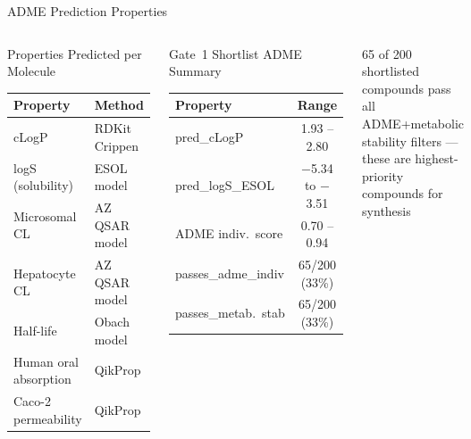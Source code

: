 \documentclass[aspectratio=169]{beamer}
\begin{document}
\begin{frame}{ADME Prediction Properties}
  \begin{columns}
    \begin{block}{Properties Predicted per Molecule}
      \small
      \begin{tabularx}{\linewidth}{lX}
        \toprule
        \textbf{Property} & \textbf{Method} \\
        \midrule
        cLogP & RDKit Crippen \\
        logS (solubility) & ESOL model \\
        Microsomal CL & AZ QSAR model \\
        Hepatocyte CL & AZ QSAR model \\
        Half-life & Obach model \\
        Human oral absorption & QikProp \\
        Caco-2 permeability & QikProp \\
        \bottomrule
      \end{tabularx}
    \end{block}
    \begin{block}{Gate~1 Shortlist ADME Summary}
      \small
      \begin{tabular}{lc}
        \toprule
        \textbf{Property} & \textbf{Range} \\
        \midrule
        pred\_cLogP        & 1.93 -- 2.80 \\
        pred\_logS\_ESOL   & $-$5.34 to $-$3.51 \\
        ADME indiv.\ score & 0.70 -- 0.94 \\
        passes\_adme\_indiv & 65/200 (33\%) \\
        passes\_metab.\ stab & 65/200 (33\%) \\
        \bottomrule
      \end{tabular}
    \end{block}
    \vspace{0.4em}
    \begin{alertblock}{}
      \small
      65 of 200 shortlisted compounds pass all ADME+metabolic stability filters --- these are highest-priority compounds for synthesis
    \end{alertblock}
  \end{columns}
\end{frame}

\end{document}

